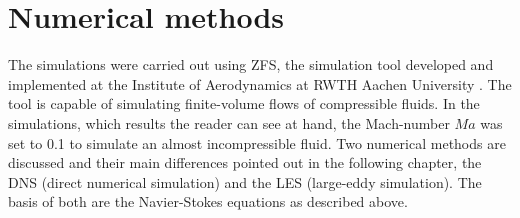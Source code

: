 \documentclass[11pt,a4paper,openany,oneside,parskip=half*]{article}
\begin{document}
\section{Numerical methods} %
The simulations were carried out using ZFS, the simulation tool developed and implemented at the Institute of Aerodynamics at RWTH Aachen University 
\cite{anAdaptiveMultilevelMultigridFormulationForCartesianHierarchicalGridMethods} \cite{aStrictlyConservativeCartesianCutCellMethodForCompressibleViscousFlowsOnAdaptiveGrids}. 
The tool is capable of simulating finite-volume flows of compressible fluids. In the simulations, which results the reader can see at hand, the Mach-number $Ma$ was set to 0.1 to simulate an almost incompressible fluid.
\newline
Two numerical methods are discussed and their main differences pointed out in the following chapter, the DNS (direct numerical simulation) and the LES (large-eddy simulation). The basis of both are the Navier-Stokes equations as described above.
\end{document}
